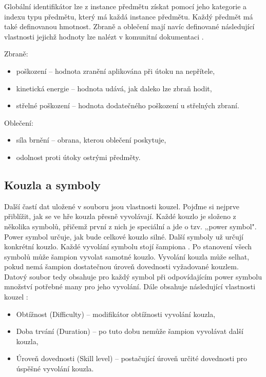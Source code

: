 Globální identifikátor lze z instance předmětu získat pomocí jeho kategorie a indexu typu předmětu,
který má každá instance předmětu. Každý předmět má také definovanou hmotnost. Zbraně a oblečení mají navíc
definované následující vlastnosti jejichž hodnoty lze nalézt v komunitní dokumentaci \cite{DMItems}.

Zbraně:
\begin{itemize}
\item poškození -- hodnota zranění aplikována při útoku na nepřítele,
\item kinetická energie -- hodnota udává, jak daleko lze zbraň hodit,
\item střelné poškození -- hodnota dodatečného poškození u střelných zbraní.
\end{itemize}

Oblečení:
\begin{itemize}
\item síla brnění -- obrana, kterou oblečení poskytuje, 
\item odolnost proti útoky ostrými předměty. 
\end{itemize}

\subsection{Kouzla a symboly}\label{magic-symbols}

Další častí dat uložené v souboru  jsou vlastnosti kouzel. Pojďme si nejprve přiblížit,
jak se ve hře kouzla přesně vyvolávají. Každé kouzlo je složeno z několika symbolů, přičemž první 
z nich je speciální a jde o tzv. ,,power symbol". Power symbol určuje, jak bude celkové kouzlo silné.
Další symboly už určují konkrétní kouzlo. Každé vyvolání symbolu stojí šampiona . Po stanovení 
všech symbolů může šampion vyvolat samotné kouzlo. Vyvolání kouzla může selhat, pokud nemá šampion 
dostatečnou úroveň dovednosti vyžadované kouzlem. Datový soubor tedy obsahuje pro každý symbol při odpovídajícím
power symbolu množství potřebné many pro jeho vyvolání. Dále obsahuje následující vlastnosti kouzel \cite{DMSpells}:

\begin{itemize}
\item Obtížnost (Difficulty) -- modifikátor obtížnosti vyvolání kouzla,
\item Doba trvání (Duration) -- po tuto dobu nemůže šampion vyvolávat další kouzla,
\item Úroveň dovednosti (Skill level) -- postačující úroveň určité dovednosti pro úspěšné vyvolání kouzla.
\end{itemize}


